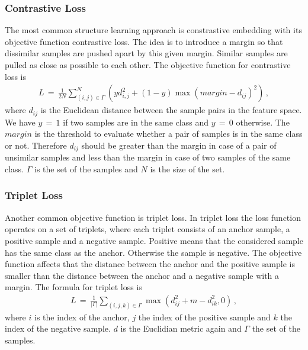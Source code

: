 \documentclass[12pt,paper=a4]{scrartcl}
\theoremstyle{break}
\begin{document}
\subsubsection{Contrastive Loss}
The most common structure learning approach is constrastive embedding with its objective function contrastive loss. The idea is to introduce a margin so that dissimilar samples are pushed apart by this given margin. Similar samples are pulled as close as possible to each other. The objective function for contrastive loss is
\begin{align}
L\, = \, \frac{1}{2N}\sum_{(i,j)\in \Gamma}^N\left( yd_{i,j}^2+\left( 1-y\right) \max \left( margin - d_{ij}\right)^2\right)\, ,
\end{align}
where $d_{ij}$ is the Euclidean distance between the sample pairs in the feature space. We have $y \, = \, 1$ if two samples are in the same class and $y \, = \, 0$ otherwise. The $margin$ is the threshold to evaluate whether a pair of samples is in the same class or not. Therefore $d_{ij}$ should be greater than the margin in case of a pair of unsimilar samples and less than the margin in case of two samples of the same class. $\Gamma$ is the set of the samples and $N$ is the size of the set.\cite{contrastive}
\subsubsection{Triplet Loss}
Another common objective function is triplet loss. In triplet loss the loss function operates on a set of triplets, where each triplet consists of an anchor sample, a positive sample and a negative sample. Positive means that the considered sample has the same class as the anchor. Otherwise the sample is negative. The objective function affects that the distance between the anchor and the positive sample is smaller than the distance between the anchor and a negative sample with a margin. The formula for triplet loss is
\begin{align}
L \, = \, \frac{1}{|\Gamma|}\sum_{(i,j,k)\in \Gamma}\max (d_{ij}^2 + m - d_{ik}^2,0)\, ,
\end{align}
where $i$ is the index of the anchor, $j$ the index of the positive sample and $k$ the index of the negative sample. $d$ is the Euclidian metric again and $\Gamma$ the set of the samples. \cite{triplet}
\end{document}
